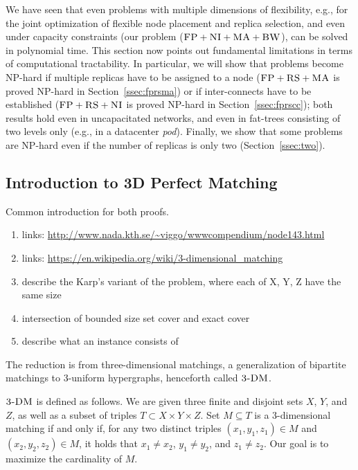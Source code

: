We have seen that even problems with multiple dimensions of
flexibility, e.g., for the joint optimization of flexible node
placement and replica selection, and even under capacity constraints
(our problem ($\textsc{FP}+\textsc{NI}+\textsc{MA}+\textsc{BW}$), can be solved in polynomial time.
This section now points out fundamental limitations in terms of
computational tractability. In particular, we will show that problems
become NP-hard if multiple replicas have to be assigned to a node
($\textsc{FP}+\textsc{RS}+\textsc{MA}$ is proved NP-hard in Section~\ref{ssec:fprsma}) or if
inter-connects have to be established ($\textsc{FP}+\textsc{RS}+\textsc{NI}$ is proved NP-hard
in Section~\ref{ssec:fprscc}); both results hold even in uncapacitated
networks, and even in fat-trees consisting of two levels only (e.g.,
in a datacenter \emph{pod}). Finally, we show that some problems are
NP-hard even if the number of replicas is only two
(Section~\ref{ssec:two}).

\subsection{Introduction to 3D Perfect Matching}

Common introduction for both proofs.

\begin{enumerate}
\item links: \url{http://www.nada.kth.se/~viggo/wwwcompendium/node143.html}
\item links: \url{https://en.wikipedia.org/wiki/3-dimensional_matching}
\item describe the Karp's variant of the problem, where each of X, Y, Z have the same size
\item intersection of bounded size set cover and exact cover
\item describe what an instance consists of
\end{enumerate}

The reduction is from three-dimensional matchings, a generalization of bipartite matchings
to 3-uniform hypergraphs, henceforth called
$\textsc{3-DM}$.~\cite{3dmatch}

$\textsc{3-DM}$ is defined as follows. We are given three finite and disjoint sets $X$, $Y$, and $Z$,
as well as a subset of triples $T\subset X \times Y \times Z$.
Set $M \subseteq T$ is a 3-dimensional matching if and only if,
for any two distinct triples $(x_1, y_1, z_1) \in M$ and $(x_2, y_2, z_2) \in M$,
it holds that $x_1\neq x_2$, $y_1\neq y_2$, and $z_1\neq z_2$. Our goal is to
maximize the cardinality of $M$.


